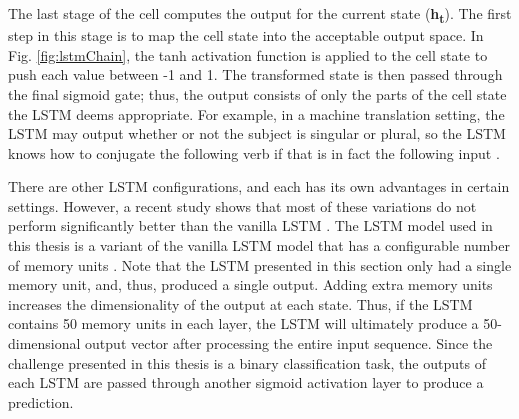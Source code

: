The last stage of the cell computes the output for the current state (\textbf{h\textsubscript{t}}).  The first step in this stage is to map the cell state into the acceptable output space.  In Fig. \ref{fig:lstmChain}, the tanh activation function is applied to the cell state to push each value between -1 and 1.  The transformed state is then passed through the final sigmoid gate; thus, the output consists of only the parts of the cell state the LSTM deems appropriate.  For example, in a machine translation setting, the LSTM may output whether or not the subject is singular or plural, so the LSTM knows how to conjugate the following verb if that is in fact the following input \cite{lstm}.

There are other LSTM configurations, and each has its own advantages in certain settings.  However, a recent study shows that most of these variations do not perform significantly better than the vanilla LSTM \cite{variousLSTMs}.  The LSTM model used in this thesis is a variant of the vanilla LSTM model that has a configurable number of memory units \cite{kerasLSTM}.  Note that the LSTM presented in this section only had a single memory unit, and, thus, produced a single output.  Adding extra memory units increases the dimensionality of the output at each state.  Thus, if the LSTM contains 50 memory units in each layer, the LSTM will ultimately produce a 50-dimensional output vector after processing the entire input sequence.  Since the challenge presented in this thesis is a binary classification task, the outputs of each LSTM are passed through another sigmoid activation layer to produce a prediction.
